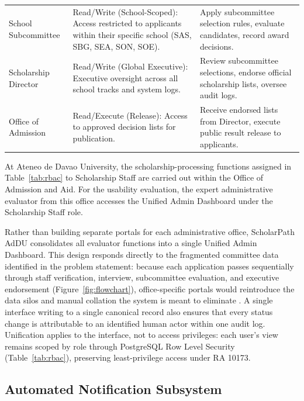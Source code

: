 \begin{table}[htbp]
\begin{tabular}{@{}p{3.0cm} p{5.4cm} p{5.4cm}@{}}
    \addlinespace
    School Subcommittee & Read/Write (School-Scoped): Access restricted to applicants within their specific school (SAS, SBG, SEA, SON, SOE). & Apply subcommittee selection rules, evaluate candidates, record award decisions. \\
    \addlinespace
    Scholarship Director & Read/Write (Global Executive): Executive oversight across all school tracks and system logs. & Review subcommittee selections, endorse official scholarship lists, oversee audit logs. \\
    \addlinespace
    Office of Admission & Read/Execute (Release): Access to approved decision lists for publication. & Receive endorsed lists from Director, execute public result release to applicants. \\
    \bottomrule
  \end{tabular}
\end{table}

At Ateneo de Davao University, the scholarship-processing functions
assigned in Table~\ref{tab:rbac} to Scholarship Staff are carried out within
the Office of Admission and Aid. For the usability evaluation, the expert
administrative evaluator from this office accesses the Unified Admin
Dashboard under the Scholarship Staff role.

Rather than building separate portals for each administrative office, ScholarPath AdDU consolidates all evaluator functions into a single Unified Admin Dashboard. This design responds directly to the fragmented committee data identified in the problem statement: because each application passes sequentially through staff verification, interview, subcommittee evaluation, and executive endorsement (Figure~\ref{fig:flowchart}), office-specific portals would reintroduce the data silos and manual collation the system is meant to eliminate \cite{ref46,ref36}. A single interface writing to a single canonical record also ensures that every status change is attributable to an identified human actor within one audit log. Unification applies to the interface, not to access privileges: each user's view remains scoped by role through PostgreSQL Row Level Security (Table~\ref{tab:rbac}), preserving least-privilege access under RA 10173.


\subsection{Automated Notification Subsystem}

